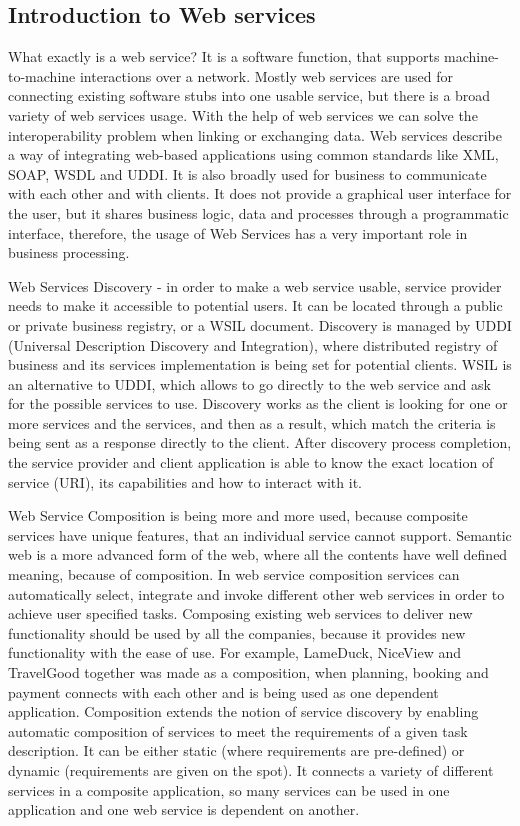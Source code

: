 \subsection{Introduction to Web services }
What exactly is a web service? It is a software function, that supports machine-to-machine interactions over a network. Mostly web services are used for connecting existing software stubs into one usable service, but there is a broad variety of web services usage. With the help of web services we can solve the interoperability problem when linking or exchanging data. Web services describe a way of integrating web-based applications using common standards like XML, SOAP, WSDL and UDDI. It is also broadly used for business to communicate with each other and with clients. It does not provide a graphical user interface for the user, but it shares business logic, data and processes through a programmatic interface, therefore, the usage of Web Services has a very important role in business processing.

Web Services Discovery - in order to make a web service usable, service provider needs to make it accessible to potential users. It can be located through a public or private business registry, or a WSIL document. Discovery is managed by UDDI (Universal Description Discovery and Integration), where distributed registry of business and its services implementation is being set for potential clients. WSIL is an alternative to UDDI, which allows to go directly to the web service and ask for the possible services to use. Discovery works as the client is looking for one or more services and the services, and then as a result, which match the criteria is being sent as a response directly to the client. After discovery process completion, the service provider and client application is able to know the exact location of service (URI), its capabilities and how to interact with it.

Web Service Composition is being more and more used, because composite services have unique features, that an individual service cannot support. Semantic web is a more advanced form of the web, where all the contents have well defined meaning, because of composition. In web service composition services can automatically select, integrate and invoke different other web services in order to achieve user specified tasks. Composing existing web services to deliver new functionality should be used by all the companies, because it provides new functionality with the ease of use. For example, LameDuck, NiceView and TravelGood together was made as a composition, when planning, booking and payment connects with each other and is being used as one dependent application. Composition extends the notion of service discovery by enabling automatic composition of services to meet the requirements of a given task description. It can be either static (where requirements are pre-defined) or dynamic (requirements are given on the spot). It connects a variety of different services in a composite application, so many services can be used in one application and one web service is dependent on another. 

